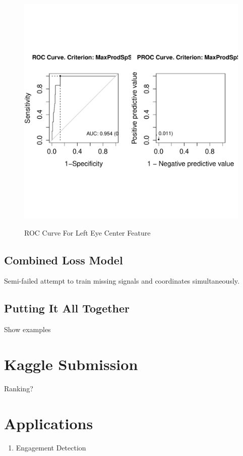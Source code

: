 \documentclass[conference]{IEEEtran}
\begin{document}
\begin{figure}[!htb]
  \centering
  \caption{ROC Curve For Left Eye Center Feature}
  \includegraphics[scale=.5]{roc_left_eye_center.pdf}
  \label{fig:roc_left_eye_center}
\end{figure}




\subsection{Combined Loss Model}
Semi-failed attempt to train missing signals and coordinates simultaneously.
\subsection{Putting It All Together}
Show examples

\section{Kaggle Submission}
Ranking?

\section{Applications}
\begin{enumerate}
\item Engagement Detection
\end{enumerate}

\medskip



\end{document}
